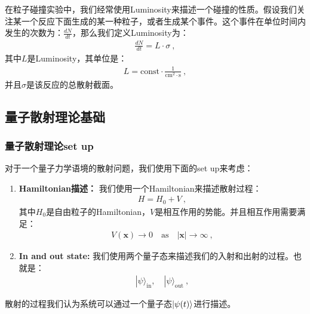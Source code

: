 在粒子碰撞实验中，我们经常使用Luminosity来描述一个碰撞的性质。假设我们关注某一个反应下面生成的某一种粒子，或者生成某个事件。这个事件在单位时间内发生的次数为：$
\displaystyle\frac{dN}{dt} $，那么我们定义Luminosity为：
\begin{align}
  \frac{dN}{dt}=L\cdot\sigma\mathrm{~,}
\end{align}
其中$ L $是Luminosity，其单位是：
\begin{align}
  L=\mathrm{const}\cdot\frac{1}{\mathrm{cm}^2\cdot\mathrm{s}}\mathrm{~,}
\end{align}
并且$ \sigma $是该反应的总散射截面。

\subsection{量子散射理论基础}

\subsubsection{量子散射理论set up}


对于一个量子力学语境的散射问题，我们使用下面的set up来考虑：
\begin{enumerate}
  \item \textbf{Hamiltonian描述：} 我们使用一个Hamiltonian来描述散射过程：
    \begin{align}
      H=H_0+V\mathrm{~,}
    \end{align}
    其中$ H_0 $是自由粒子的Hamiltonian，$ V $是相互作用的势能。并且相互作用需要满足：
    \begin{align}
      V(\mathbf{x})\to 0\quad\mathrm{as}\quad |\mathbf{x}|\to\infty\mathrm{~,}
    \end{align}
  \item \textbf{In and out state: }我们使用两个量子态来描述我们的入射和出射的过程。也就是：
    \begin{align}
      |\psi\rangle_{\mathrm{in}},\quad |\psi\rangle_{\mathrm{out}}\mathrm{~,}
    \end{align}
\end{enumerate}
散射的过程我们认为系统可以通过一个量子态$ \ket{\psi(t)} $进行描述。

\bigskip
{}

